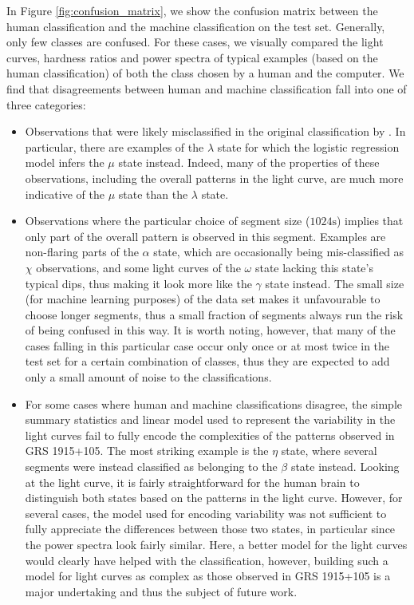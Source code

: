 \documentclass[12pt]{emulateapj}
\begin{document}
In Figure \ref{fig:confusion_matrix}, we show the confusion matrix between the human classification and the machine classification on the 
test set. Generally, only few classes are confused. For these cases, we visually compared the light curves, hardness ratios and power spectra of 
typical examples (based on the human classification) of both the class chosen by a human and the computer. We find that disagreements between 
human and machine classification fall into one of three categories:
\begin{itemize}
\item{Observations that were likely misclassified in the original classification by \citet{belloni2000}. In particular, there are examples of the 
$\lambda$ state for which the logistic regression model infers the $\mu$ state instead. Indeed, many of the properties of these observations, including 
the overall patterns in the light curve, are much more indicative of the $\mu$ state than the $\lambda$ state.}
\item{Observations where the particular choice of segment size ($1024\mathrm{s}$) implies that only part of the overall pattern is observed in this 
segment. Examples are non-flaring parts of the $\alpha$ state, which are occasionally being mis-classified as $\chi$ observations, and some light 
curves of the $\omega$ state lacking this state's typical dips, thus making it look more like the $\gamma$ state instead. The small size (for machine 
learning purposes) of the data set makes it unfavourable to choose longer segments, thus a small fraction of segments always run the risk of being 
confused in this way. It is worth noting, however, that many of the cases falling in this particular case occur only once or at most twice in the 
test set for a certain combination of classes, thus they are expected to add only a small amount of noise to the classifications.}
\item{For some cases where human and machine classifications disagree, the simple summary statistics and linear model used to represent the variability
 in the light curves fail to fully encode the complexities of the patterns observed in GRS 1915+105. The most striking example is the $\eta$ state, where several 
 segments were instead classified as belonging to the $\beta$ state instead. Looking at the light curve, it is fairly straightforward for the human brain to distinguish 
 both states based on the patterns in the light curve. However, for several cases, the model used for encoding variability was not sufficient to fully appreciate the differences between those two states, in particular since the power spectra look fairly similar. Here, a better model for the light curves would clearly have helped with the classification, however, building such a model for light curves as complex as those observed in GRS 1915+105 is a major undertaking and thus the subject of future work.}
\end{itemize}
\end{document}
